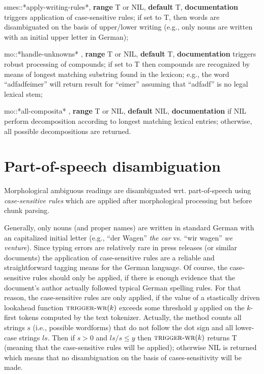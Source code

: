  {\sc smes::*apply-writing-rules*},
{\bf range} {\sc T} or {\sc NIL},
{\bf default}  {\sc T},
{\bf documentation} triggers application of case-sensitive rules;
if set to {\sc T}, then words are disambiguated on the basis of
upper/lower writing (e.g., only nouns are written with an initial upper
letter in German);
\vspace{3mm}

 {\sc mo::*handle-unknowns* },
{\bf range} {\sc T} or {\sc NIL},
{\bf default} {\sc T},
{\bf documentation} triggers  robust processing of compounds;
if set to {\sc T} then compounds are recognized by means of longest
matching substring found in the lexicon; e.g., the word ``adfadfeimer''
will return result for ``eimer'' assuming that ``adfadf'' is no legal
lexical stem;
\vspace{3mm}

 {\sc mo::*all-composita* },
{\bf range} {\sc T} or {\sc NIL},
{\bf default} {\sc NIL},
{\bf documentation} if {\sc NIL} perform decomposition according to
longest matching lexical entries;
otherwise, all possible decompositions are returned.

\section{Part-of-speech disambiguation}
Morphological ambiguous readings are disambiguated wrt. part-of-speech
using {\em case-sensitive rules} which are applied after morphological
processing but before chunk parsing.

Generally, only nouns (and proper names) are written in standard German
with an capitalized initial letter  (e.g., ``der Wagen'' {\em the car}
vs. ``wir wagen'' {\em we venture}).
Since typing errors are relatively rare in press releases (or similar
documents) the application of case-sensitive rules are a reliable and
straightforward tagging means for the German language. Of course, the 
case-sensitive rules should only be applied, if there is enough
evidence that the document's author actually followed typical German
spelling rules. For that reason, the case-sensitive rules are only applied, if
the value of a stastically driven lookahead function $\mbox{{\sc
trigger-wr}}(k)$ 
exceeds some threshold $y$ applied on the $k$-first tokens computed by the
{\sc text tokenizer}. Actually, the method counts all strings $s$ (i.e.,
possible wordforms) that do not follow the dot sign and all lower-case
strings $ls$. Then if $s > 0$ and  $ls/s \leq y$
then $\mbox{{\sc trigger-wr}}(k)$ returns T
(meaning that 
the case-sensitive rules will be applied); otherwise NIL is returned
which means  that  no disambiguation on the basis of cases-sensitivity
will be made. 


